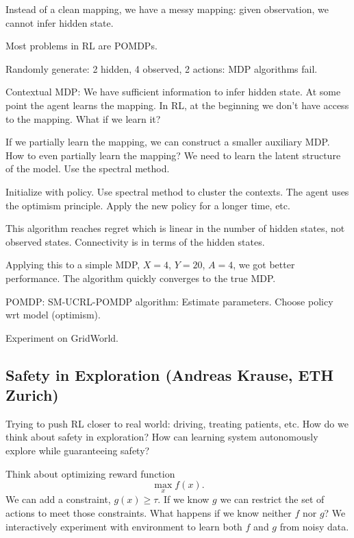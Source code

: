 Instead of a clean mapping, we have a messy mapping: given observation, we cannot infer hidden state.

Most problems in RL are POMDPs. 

Randomly generate: 2 hidden, 4 observed, 2 actions: MDP algorithms fail.

Contextual MDP: We have sufficient information to infer hidden state. At some point the agent learns the mapping. In RL, at the beginning we don't have access to the mapping. What if we learn it? 

If we partially learn the mapping, we can construct a smaller auxiliary MDP. How to even partially learn the mapping? We need to learn the latent structure of the model. Use the spectral method.

Initialize with policy. Use spectral method to cluster the contexts. The agent uses the optimism principle. Apply the new policy for a longer time, etc.


This algorithm reaches regret which is linear in the number of hidden states, not observed states. Connectivity is in terms of the hidden states.

Applying this to a simple MDP, $X=4$, $Y=20$, $A=4$, we got better performance. The algorithm quickly converges to the true MDP.

POMDP: SM-UCRL-POMDP  algorithm: Estimate parameters. Choose policy wrt model (optimism). 

Experiment on GridWorld.

\subsection{Safety in Exploration
(Andreas Krause, ETH Zurich)
}

Trying to push RL closer to real world: driving, treating patients, etc. 
How do we think about safety in exploration? %
How can learning system autonomously explore while guaranteeing safety?

Think about optimizing reward function 
$$
\max_x f(x).
$$
We can add a constraint, $g(x)\ge \tau$. If we know $g$ we can restrict the set of actions to meet those constraints. What happens if we know neither $f$ nor $g$? We interactively experiment with environment to learn both $f$ and $g$ from noisy data.

